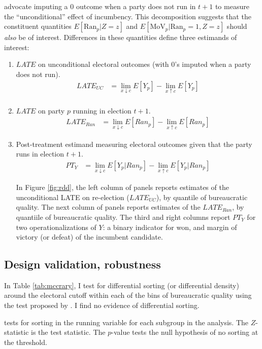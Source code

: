 \documentclass[11pt,english]{article}
\begin{document}
\citet{klasnjatitiunik2017} advocate imputing a 0 outcome when a party does not run in $t+1$ to measure the ``unconditional'' effect of incumbency. This decomposition suggests that the constituent quantities $ E[\text{Ran}_p|Z = z]$ and $E[\text{MoV}_p|\text{Ran}_p = 1, Z = z]$ should \emph{also} be of interest. Differences in these quantities define three estimands of interest:
\begin{enumerate}
\item $LATE$ on unconditional electoral outcomes (with 0's imputed when a party does not run).
\begin{align*}
LATE_{UC} &= \lim_{x \downarrow c}E[Y_p] -\lim_{x \uparrow c}E[Y_p] \\
\end{align*}
\item $LATE$ on party $p$ running in election $t+1$.
\begin{align*}
LATE_{Ran} &=  \lim_{x \downarrow c}E[Ran_p] -\lim_{x \uparrow c}E[Ran_p] 
\end{align*}
\item Post-treatment estimand measuring electoral outcomes given that the party runs in election $t+1$.
\begin{align*}
PT_{Y} &=  \lim_{x \downarrow c}E[Y_p|Ran_p] -\lim_{x \uparrow c}E[Y_p|Ran_p] 
\end{align*}

In Figure \ref{fig:rdd}, the left column of panels reports estimates of the unconditional LATE on re-election ($LATE_{UC}$), by quantile of bureaucratic quality. The next column of panels reports estimates of the $LATE_{Ran}$, by quantiile of bureaucratic quality. The third and right columns report $PT_Y$ for two operationalizations of $Y$: a binary indicator for won, and margin of victory (or defeat) of the incumbent candidate. 
\end{enumerate}



\subsection{Design validation, robustness}

In Table \ref{tab:mccrary}, I test for differential sorting (or differential density) around the electoral cutoff within each of the bins of bureaucratic quality using the test proposed by \citet{mccrary2008}. I find no evidence of differential sorting.

\begin{table}[h]
\centering

\caption{\citet{mccrary2008} tests for sorting in the running variable for each subgroup in the analysis. The $Z$-statistic is the test statistic. The $p$-value tests the null hypothesis of no sorting at the threshold.}\label{tab:mccrary}
\end{table}
\end{document}
